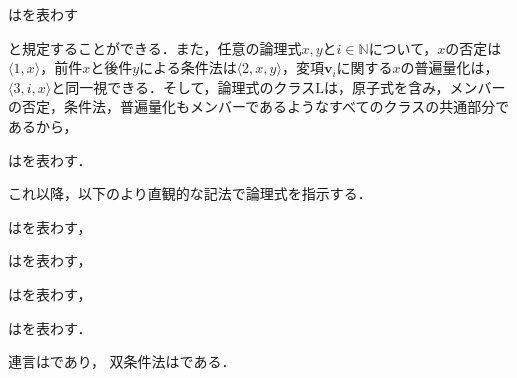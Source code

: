 \begin{df}
\label{df:原子式のクラス}
はを表わす
\end{df}

\noindent と規定することができる．また，任意の論理式$x,y$と$i\in \mathbb{N}$について，$x$の否定は$\langle 1,x \rangle$，前件$x$と後件$y$による条件法は$ \langle 2,x,y \rangle $，変項$ \boldsymbol{v}_i $に関する$x$の普遍量化は，$\langle 3,i,x \rangle$と同一視できる．そして，論理式のクラス$\mathrm{L}$は，原子式を含み，メンバーの否定，条件法，普遍量化もメンバーであるようなすべてのクラスの共通部分であるから，

\begin{df}
\label{df:論理式のクラス}
はを表わす．
\end{df}

\noindent これ以降，以下のより直観的な記法で論理式を指示する．

\begin{df}[原子式]
\label{df:原子式}
はを表わす，
\end{df}

\begin{df}[否定]
\label{df:否定}
はを表わす，
\end{df}

\begin{df}[条件法]
\label{df:条件法}
はを表わす，
\end{df}

\begin{df}[普遍量化]
\label{df:普遍量化}
はを表わす．
\end{df}

\noindent 連言はであり，
双条件法はである．

